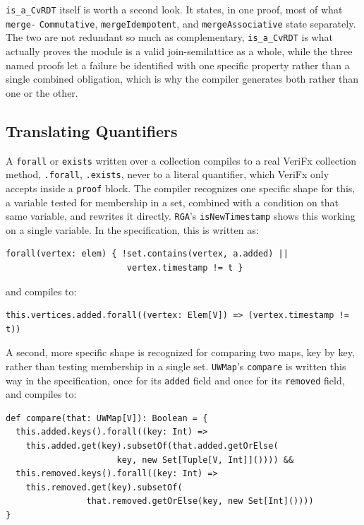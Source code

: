 \texttt{is\_a\_CvRDT} itself is worth a second look. It states, in one proof, most of what \texttt{merge-} 
\texttt{Commutative}, \texttt{mergeIdempotent}, and \texttt{mergeAssociative} state separately. The two are not redundant so much as
complementary, \texttt{is\_a\_CvRDT} is what actually proves the module is a valid join-semilattice as a whole, while
the three named proofs let a failure be identified with one specific property rather than a single combined obligation,
which is why the compiler generates both rather than one or the other.

\subsection{Translating Quantifiers}
\label{sub:vfx-quantifiers}

A \texttt{forall} or \texttt{exists} written over a collection compiles to a real VeriFx collection method,
\texttt{.forall}, \texttt{.exists}, never to a literal quantifier, which VeriFx only accepts inside a \texttt{proof}
block. The compiler recognizes one specific shape for this, a variable tested for membership in a set, combined with a
condition on that same variable, and rewrites it directly. \texttt{RGA}'s \texttt{isNewTimestamp} shows this working on
a single variable. In the specification, this is written as:

\begin{verbatim}
forall(vertex: elem) { !set.contains(vertex, a.added) ||
                        vertex.timestamp != t }
\end{verbatim}
and compiles to:
\begin{verbatim}
this.vertices.added.forall((vertex: Elem[V]) => (vertex.timestamp != t))
\end{verbatim}

A second, more specific shape is recognized for comparing two maps, key by key, rather than testing membership in a
single set. \texttt{UWMap}'s \texttt{compare} is written this way in the specification, once for its \texttt{added}
field and once for its \texttt{removed} field, and compiles to:

\begin{verbatim}
def compare(that: UWMap[V]): Boolean = {
  this.added.keys().forall((key: Int) =>
    this.added.get(key).subsetOf(that.added.getOrElse(
                      key, new Set[Tuple[V, Int]]()))) &&
  this.removed.keys().forall((key: Int) =>
    this.removed.get(key).subsetOf(
                that.removed.getOrElse(key, new Set[Int]())))
}
\end{verbatim}

